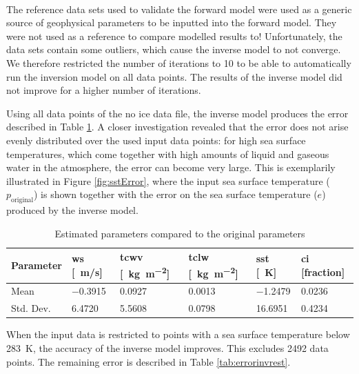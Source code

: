 \documentclass[11pt, a4paper]{article}
\begin{document}
\ \\
The reference data sets used to validate the forward model were used as a generic source of geophysical parameters to be inputted into the forward model. They were not used as a reference to compare modelled results to! Unfortunately, the data sets contain some outliers, which cause the inverse model to not converge. We therefore restricted the number of iterations to 10 to be able to automatically run the inversion model on all data points. The results of the inverse model did not improve for a higher number of iterations. 
\newline

Using all data points of the no ice data file, the inverse model produces the error described in Table \ref{tab:errorinv}. A closer investigation revealed that the error does not arise evenly distributed over the used input data points: for high sea surface temperatures, which come together with high amounts of liquid and gaseous water in the atmosphere, the error can become very large. This is exemplarily illustrated in Figure \ref{fig:sstError}, where the input sea surface temperature (\( p_\text{original} \)) is shown together with the error on the sea surface temperature (\( e \)) produced by the inverse model.
\newline

\begin{table}[h]
\centering
\begin{tabular}{@{} l l l l l l @{}}
Parameter & ws [\SI{}{m/s}] & tcwv [\SI{}{\kilo\gram\per\square\meter}] & tclw [\SI{}{\kilo\gram\per\square\meter}] & sst [\SI{}{K}] & ci [fraction] \\
\midrule
Mean & \SI{-0.3915}{} & \SI{0.0927}{} & \SI{0.0013}{} & \SI{-1.2479}{} & \SI{0.0236}{} \\
Std. Dev. & \SI{6.4720}{} & \SI{5.5608}{} & \SI{0.0798}{} & \SI{16.6951}{} & \SI{0.4234}{} \\
\midrule
\end{tabular}
\caption{Estimated parameters compared to the original parameters}
\label{tab:errorinv}
\end{table}

When the input data is restricted to points with a sea surface temperature below \SI{283}{K}, the accuracy of the inverse model improves. This excludes 2492 data points. The remaining error is described in Table \ref{tab:errorinvrest}.
\newline
\end{document}
